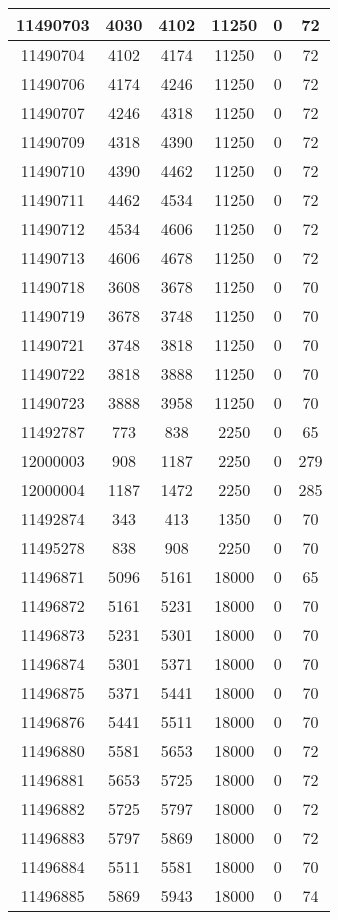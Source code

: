 \begin{appendices}
\begin{center}
\begin{longtable}{|c|c|c|c|c|c|}
11490703 & 4030  & 4102  & 11250 & 0     & 72  \\ \hline
11490704 & 4102  & 4174  & 11250 & 0     & 72  \\ \hline
11490706 & 4174  & 4246  & 11250 & 0     & 72  \\ \hline
11490707 & 4246  & 4318  & 11250 & 0     & 72  \\ \hline
11490709 & 4318  & 4390  & 11250 & 0     & 72  \\ \hline
11490710 & 4390  & 4462  & 11250 & 0     & 72  \\ \hline
11490711 & 4462  & 4534  & 11250 & 0     & 72  \\ \hline
11490712 & 4534  & 4606  & 11250 & 0     & 72  \\ \hline
11490713 & 4606  & 4678  & 11250 & 0     & 72  \\ \hline
11490718 & 3608  & 3678  & 11250 & 0     & 70  \\ \hline
11490719 & 3678  & 3748  & 11250 & 0     & 70  \\ \hline
11490721 & 3748  & 3818  & 11250 & 0     & 70  \\ \hline
11490722 & 3818  & 3888  & 11250 & 0     & 70  \\ \hline
11490723 & 3888  & 3958  & 11250 & 0     & 70  \\ \hline
11492787 & 773   & 838   & 2250  & 0     & 65  \\ \hline
12000003 & 908   & 1187  & 2250  & 0     & 279 \\ \hline
12000004 & 1187  & 1472  & 2250  & 0     & 285 \\ \hline
11492874 & 343   & 413   & 1350  & 0     & 70  \\ \hline
11495278 & 838   & 908   & 2250  & 0     & 70  \\ \hline
11496871 & 5096  & 5161  & 18000 & 0     & 65  \\ \hline
11496872 & 5161  & 5231  & 18000 & 0     & 70  \\ \hline
11496873 & 5231  & 5301  & 18000 & 0     & 70  \\ \hline
11496874 & 5301  & 5371  & 18000 & 0     & 70  \\ \hline
11496875 & 5371  & 5441  & 18000 & 0     & 70  \\ \hline
11496876 & 5441  & 5511  & 18000 & 0     & 70  \\ \hline
11496880 & 5581  & 5653  & 18000 & 0     & 72  \\ \hline
11496881 & 5653  & 5725  & 18000 & 0     & 72  \\ \hline
11496882 & 5725  & 5797  & 18000 & 0     & 72  \\ \hline
11496883 & 5797  & 5869  & 18000 & 0     & 72  \\ \hline
11496884 & 5511  & 5581  & 18000 & 0     & 70  \\ \hline
11496885 & 5869  & 5943  & 18000 & 0     & 74  \\ \hline


\end{longtable}
\end{center}
\end{appendices}
